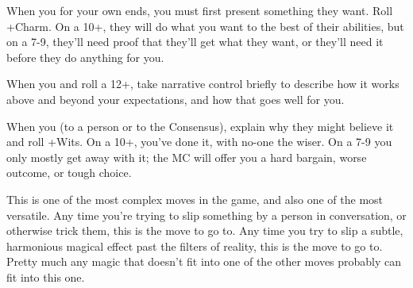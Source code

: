 \begin{multicols}{3}
  \SEPARATOR

  \begin{move}
    When you  for your own ends, you must first
    present something they want. Roll +Charm. On a 10+, they will do
    what you want to the best of their abilities, but on a 7-9,
    they'll need proof that they'll get what they want, or they'll
    need it before they do anything for you.
  \end{move}

  \SEPARATOR

  \begin{move}
    When you  and
    roll a 12+, take narrative control briefly to describe how it
    works above and beyond your expectations, and how that goes well
    for you.
  \end{move}

  \columnbreak
    
  \begin{move}
    When you  (to a person or to the Consensus),
    explain why they might believe it and roll +Wits. On a 10+, you've
    done it, with no-one the wiser. On a 7-9 you only mostly get away
    with it; the MC will offer you a hard bargain, worse outcome, or
    tough choice.
\begin{movedetail}
  This is one of the most complex moves in the game, and also one of
  the most versatile. Any time you're trying to slip something by a
  person in conversation, or otherwise trick them, this is the move to
  go to. Any time you try to slip a subtle, harmonious magical
  effect past the filters of reality, this is the move to go
  to. Pretty much any magic that doesn't fit into one of the other
  moves probably can fit into this one.
\end{movedetail}
  \end{move}

  \vspace{1em}
  
  \SEPARATOR


\end{multicols}

